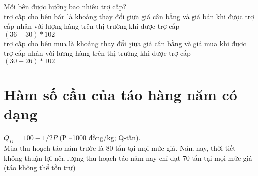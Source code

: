 \begin{enumerate}[a.]
        Mỗi bên được hưởng bao nhiêu trợ cấp?\\
        trợ cấp cho bên bán là khoảng thay đổi giữa giá cân bằng và giá bán khi được trợ cấp nhân với lượng hàng trên thị trường khi được trợ cấp\\
        $(36 - 30) * 102$ \\
        trợ cấp cho bên mua là khoảng thay đổi giữa giá cân bằng và giá mua khi được trợ cấp nhân với lượng hàng trên thị trường khi được trợ cấp\\
        $(30 - 26) * 102$ \\
        


\end{enumerate}

\section{ Hàm số cầu của táo hàng năm có dạng }
$ Q_D = 100 - 1/2P$ (P –1000 đồng/kg; Q-tấn). \\
Mùa thu hoạch táo năm trước là 80 tấn tại mọi mức giá. Năm
nay, thời tiết không thuận lợi nên lượng thu hoạch táo năm nay chỉ đạt 70 tấn tại mọi mức
giá (táo không thể tồn trữ)
